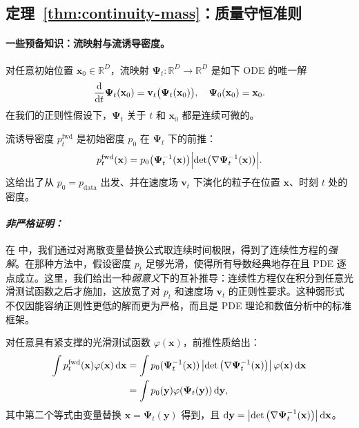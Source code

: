\subsection{定理~\ref{thm:continuity-mass}：质量守恒准则}\label{app-sec:mass-conservation}

\paragraph{一些预备知识：流映射与流诱导密度。} 对任意初始位置 $\mathbf{x}_0\in\mathbb{R}^D$，流映射
$\bm{\Psi}_t:\mathbb{R}^D\to\mathbb{R}^D$ 是如下 ODE 的唯一解
\[
\frac{\mathop{}\!\mathrm{d}}{\mathop{}\!\mathrm{d} t} \bm{\Psi}_t(\mathbf{x}_0)
= \mathbf{v}_t\bigl(\bm{\Psi}_t(\mathbf{x}_0)\bigr), 
\quad \bm{\Psi}_0(\mathbf{x}_0)=\mathbf{x}_0.
\]
在我们的正则性假设下，$\bm{\Psi}_t$ 关于 $t$ 和 $\mathbf{x}_0$ 都是连续可微的。

流诱导密度 $p_t^{\mathrm{fwd}}$ 是初始密度 $p_0$ 在 $\bm{\Psi}_t$ 下的前推：
\[
p_t^{\mathrm{fwd}}(\mathbf{x})
= p_0\bigl(\bm{\Psi}_t^{-1}(\mathbf{x})\bigr)
  \Bigl|\det \bigl(\nabla\bm{\Psi}_t^{-1}(\mathbf{x})\bigr)\Bigr|.
\]
这给出了从 $p_0=p_{\mathrm{data}}$ 出发、并在速度场 $\mathbf{v}_t$ 下演化的粒子在位置 $\mathbf{x}$、时刻 $t$ 处的密度。


\paragraph{\textit{非严格证明：}} 
在  中，我们通过对离散变量替换公式取连续时间极限，得到了连续性方程的\emph{强解}。在那种方法中，假设密度 $p_t$ 足够光滑，使得所有导数经典地存在且 PDE 逐点成立。这里，我们给出一种\emph{弱意义}下的互补推导：连续性方程仅在积分到任意光滑测试函数之后才施加，这放宽了对 $p_t$ 和速度场 $\mathbf{v}_t$ 的正则性要求。这种弱形式不仅因能容纳正则性更低的解而更为严格，而且是 PDE 理论和数值分析中的标准框架。


对任意具有紧支撑的光滑测试函数 $ \varphi(\mathbf{x}) $，前推性质给出：
\begin{align*}
    \int p_t^{\mathrm{fwd}}(\mathbf{x}) \varphi(\mathbf{x})  \mathop{}\!\mathrm{d}\mathbf{x} &= \int p_0(\bm{\Psi}_t^{-1}(\mathbf{x})) \left| \det\left( \nabla \bm{\Psi}_t^{-1}(\mathbf{x}) \right) \right| \varphi(\mathbf{x}) \mathop{}\!\mathrm{d}\mathbf{x}\\ &=  \int p_0(\mathbf{y}) \varphi(\bm{\Psi}_t(\mathbf{y})) \mathop{}\!\mathrm{d}\mathbf{y},
\end{align*}
其中第二个等式由变量替换 $ \mathbf{x} = \bm{\Psi}_t(\mathbf{y}) $ 得到，且 $ \mathop{}\!\mathrm{d}\mathbf{y} = \left| \det\left( \nabla \bm{\Psi}_t^{-1}(\mathbf{x}) \right) \right| \mathop{}\!\mathrm{d}\mathbf{x} $。


